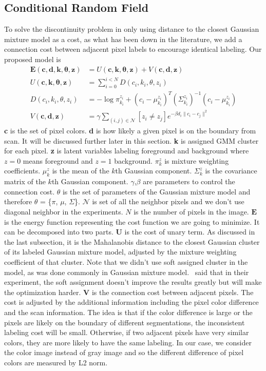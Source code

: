 \documentclass{article} %
\begin{document}
\subsection{Conditional Random Field}
To solve the discontinuity problem in only using distance to the
closest Gaussian mixture model as a cost, as what has been down in the
literature, we add a connection cost between adjacent pixel labels to
encourage identical labeling. Our proposed model is
\begin{align}
\mathbf{E}(\mathbf{c}, \mathbf{d},\mathbf{k}, \mathbf{\theta},
\mathbf{z}) &= U(\mathbf{c},\mathbf{k}, \mathbf{\theta}, \mathbf{z}) +
V(\mathbf{c}, \mathbf{d}, \mathbf{z}) \label{eq:energy}\\
U(\mathbf{c},\mathbf{k}, \mathbf{\theta}, \mathbf{z}) &=
\sum_{i=0}^{i<N} D(c_i, k_i, \theta, z_i) \\
D(c_i, k_i, \theta, z_i) &= -\log \pi_{k_i}^{z_i} + (c_i -
\mu_{k_i}^{z_i})^T (\Sigma_{k_i}^{z_i})^{-1} (c_i - \mu_{k_i}^{z_i})
\\
V(\mathbf{c}, \mathbf{d}, \mathbf{z}) &= \gamma \sum_{(i, j) \in
  \mathcal{N}} [z_i \not = z_j] e^{ -\beta d_i \| c_i - c_j\|^2}
\end{align}
\textbf{c} is the set of pixel colors.
\textbf{d} is  how likely a given pixel is on the boundary from
scan. It will be discussed further later in this section.
\textbf{k} is assigned GMM cluster for each pixel.
\textbf{z} is latent variables labeling foreground and background
where $z=0$ means foreground and $z=1$ background.
$\pi_k^z$ is mixture weighting coefficients.
$\mu_k^z$ is the mean of the $k$th Gaussian component.
$\Sigma_k^z$ is the covariance matrix of the $k$th Gaussian component.
$\gamma$,$\beta$ are parameters to control the connection cost.
$\theta$ is the set of parameters of the Gaussian mixture model and
therefore $\theta$ = \{$\pi$, $\mu$, $\Sigma$\}.
$\mathcal{N}$ is set of all the neighbor pixels and we don't use
diagonal neighbor in the experiments. $N$ is the number of pixels in
the image. $\mathbf{E}$ is the energy function representing the cost function we
are going to minimize. It can be decomposed into two
parts. $\mathbf{U}$ is the cost of unary term. As discussed in the
last subsection, it is the Mahalanobis distance to the closest
Gaussian cluster of its labeled Gaussian mixture model, adjusted by
the mixture weighting coefficient of that cluster. Note that we didn't
use soft assigned cluster in the model, as was done commonly in
Gaussian mixture model.~\citet{Rother2004GrabCut} said that in their
experiment, the soft assignment doesn't improve the results greatly
but will make the optimization harder. $\mathbf{V}$ is the connection
cost between adjacent pixels. The cost is adjusted by the additional
information including the pixel color difference and the scan
information. The idea is that if the color difference is large or the
pixels are likely on the boundary of different segmentations, the
inconsistent labeling cost will be small. Otherwise, if two adjacent
pixels have very similar colors, they are more likely to have the same
labeling. In our case, we consider the color image instead of gray
image and so the different difference of pixel colors are measured by
L2 norm.
\end{document}
